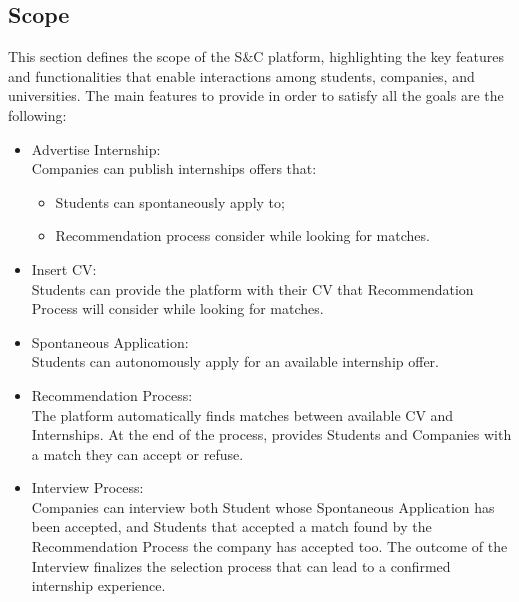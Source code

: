 \subsection{Scope}
This section defines the scope of the S\&C platform, highlighting the key features and functionalities that enable interactions among students, companies, and universities.
The main features to provide in order to satisfy all the goals are the following:
\begin{itemize}
\item {\color{titleColor}Advertise Internship:}\\ Companies can publish internships offers that:
    \begin{itemize}
        \item Students can spontaneously apply to;
        \item Recommendation process consider while looking for matches.
    \end{itemize}
\item {\color{titleColor}Insert CV:}\\ Students can provide the platform with their CV that Recommendation Process will consider while looking for matches.
\item {\color{titleColor}Spontaneous Application:}\\ Students can autonomously apply for an available internship offer.
\item {\color{titleColor}Recommendation Process:}\\ The platform automatically finds matches between available CV and Internships. At the end of the process, provides Students and Companies with a match they can accept or refuse.
\item {\color{titleColor}Interview Process:}\\
    Companies can interview both Student whose Spontaneous Application has been accepted, and Students that accepted a match found by the Recommendation Process the company has accepted too. The outcome of the Interview finalizes the selection process that can lead to a confirmed internship experience.  

\end{itemize}
